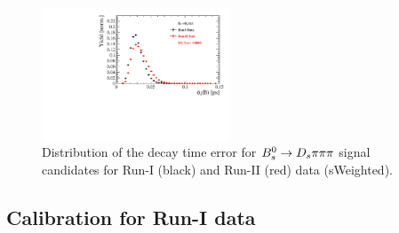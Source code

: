 \begin{figure}[h]
\centering
\includegraphics[height=!,width=0.5\textwidth]{figs/dataVsMC/run1vs2_norm/Ds2all_Bs_DTF_TAUERR.pdf}
\caption{Distribution of the decay time error for ${{B}^0_{s}}\rightarrow{\ensuremath{{D}_{s}}}{\ensuremath{\pi}}{\ensuremath{\pi}}{\ensuremath{\pi}}$ signal candidates for Run-I (black) and Run-II (red) data (sWeighted).}
\label{fig:Bs_DTFERR_Comp}
\end{figure}


\clearpage
\subsection{Calibration for Run-I data} 

